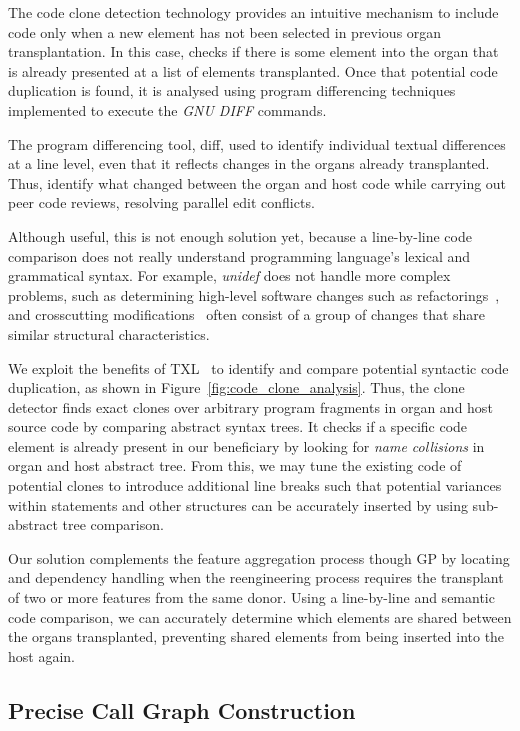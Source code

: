 The code clone detection technology provides an intuitive mechanism to include code only when a new element has not been selected in previous organ transplantation. In this case, \autoscalpel checks if there is some element into the organ that is already presented at a list of elements transplanted. Once that potential code duplication is found, it is analysed using program differencing techniques implemented to execute the \emph{GNU DIFF} commands.

The program differencing tool, diff, used to identify individual textual differences at a line level, even that it reflects changes in the organs already transplanted. Thus, \autoscalpel identify what changed between the organ and host code while carrying out peer code reviews, resolving parallel edit conflicts. 

Although useful, this is not enough solution yet, because a line-by-line code comparison does not really understand programming language's lexical and grammatical syntax. For example, \emph{unidef} does not handle more complex problems, such as determining high-level software changes such as refactorings~\cite{Fowler1999}, \cite{Chikofsky1990} and crosscutting modifications~\cite{Kiczales1997} often consist of a group of changes that share similar structural characteristics.

We exploit the benefits of TXL~\cite{Cordy2006} to identify and compare potential syntactic code duplication, as shown in Figure~\ref{fig:code_clone_analysis}. Thus, the clone detector finds exact clones over arbitrary program fragments in organ and host source code by comparing abstract syntax trees. It checks if a specific code element is already present in our beneficiary by looking for \emph{name collisions} in organ and host abstract tree. From this, we may tune the existing code of potential clones to introduce additional line breaks such that potential variances within statements and other structures can be accurately inserted by using sub-abstract tree comparison. 

Our solution complements the feature aggregation process though GP by locating and dependency handling when the reengineering process requires the transplant of two or more features from the same donor. Using a line-by-line and semantic code comparison, we can accurately determine which elements are shared between the organs transplanted, preventing shared elements from being inserted into the host again. 

\subsection{Precise Call Graph Construction}

